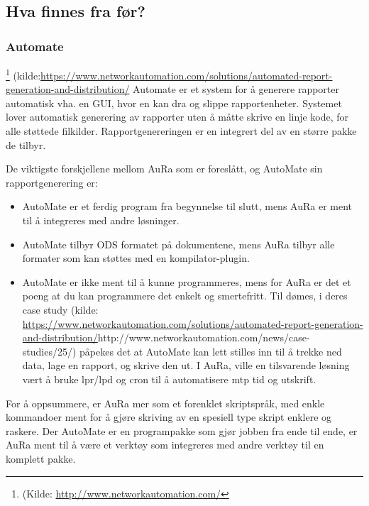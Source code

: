 \documentclass[11pt]{article}
\begin{document}
\subsection{Hva finnes fra før?}



\subsubsection{Automate}
\footnote{(Kilde: \href{(http://www.networkautomation.com/}{http://www.networkautomation.com/}}
(kilde:\href{(https://www.networkautomation.com/solutions/automated-report-generation-and-distribution/}{https://www.networkautomation.com/solutions/automated-report-generation-and-distribution/}
Automate er et system for å generere rapporter automatisk vha. en GUI, hvor en kan dra og slippe rapportenheter. Systemet lover automatisk generering av rapporter uten å måtte skrive en linje kode, for alle støttede filkilder. Rapportgenereringen er en integrert del av en større pakke de tilbyr.



De viktigste forskjellene mellom AuRa som er foreslått, og AutoMate sin rapportgenerering er:




\begin{itemize}
\item AutoMate er et ferdig program fra begynnelse til slutt, mens AuRa er ment til å integreres med andre løsninger.
\item AutoMate tilbyr ODS formatet på dokumentene, mens AuRa tilbyr alle formater som kan støttes med en kompilator-plugin.
\item AutoMate er ikke ment til å kunne programmeres, mens for AuRa er det et poeng at du kan programmere det enkelt og smertefritt. Til dømes, i deres case study (kilde: \href{(https://www.networkautomation.com/solutions/automated-report-generation-and-distribution/}{https://www.networkautomation.com/solutions/automated-report-generation-and-distribution/}http://www.networkautomation.com/news/case-studies/25/) påpekes det at AutoMate kan lett stilles inn til å trekke ned data, lage en rapport, og skrive den ut. I AuRa, ville en tilsvarende løsning vært å bruke lpr/lpd og cron til å automatisere mtp tid og utskrift.
\end{itemize}




For å oppsummere, er AuRa mer som et forenklet skriptspråk, med enkle kommandoer ment for å gjøre skriving av en spesiell type skript enklere og raskere. Der AutoMate er en programpakke som gjør jobben fra ende til ende, er AuRa ment til å være et verktøy som integreres med andre verktøy til en komplett pakke.
\end{document}
